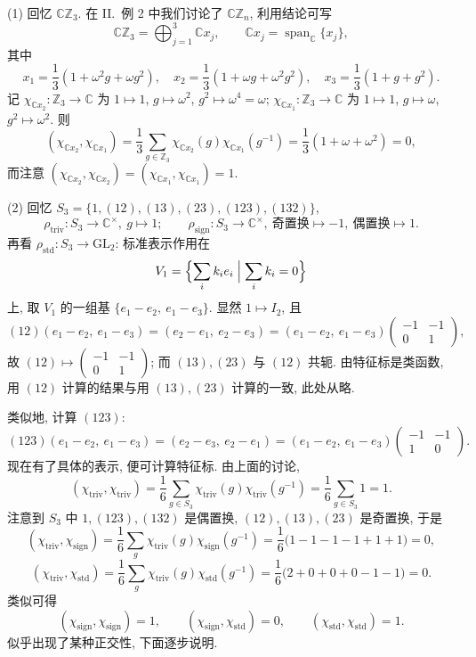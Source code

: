 \begin{example}\label{eg:char-Z3}
\mbox{}\par\vspace{-0.2em}
(1) 回忆 $\mathbb{C}\mathbb{Z}_3$. 在 II.\ 例 2 中我们讨论了 $\mathbb{C}\mathbb{Z}_n$, 利用结论可写
\[
  \mathbb{C}\mathbb{Z}_3=\bigoplus_{j=1}^{3}\mathbb{C}x_j,\qquad
  \mathbb{C}x_j=\operatorname{span}_{\mathbb{C}}\{x_j\},
\]
其中
\[
  x_1=\frac{1}{3}(1+\omega^2g+\omega g^2),\quad
  x_2=\frac{1}{3}(1+\omega g+\omega^2g^2),\quad
  x_3=\frac{1}{3}(1+g+g^2).
\]
记 $\chi_{\mathbb{C}x_2}\colon\mathbb{Z}_3\to\mathbb{C}$ 为
$1\mapsto 1$, $g\mapsto\omega^2$, $g^2\mapsto\omega^4=\omega$;
$\chi_{\mathbb{C}x_1}\colon\mathbb{Z}_3\to\mathbb{C}$ 为
$1\mapsto 1$, $g\mapsto\omega$, $g^2\mapsto\omega^2$. 则
\[
  (\chi_{\mathbb{C}x_2},\chi_{\mathbb{C}x_1})
  =\frac{1}{3}\sum_{g\in\mathbb{Z}_3}\chi_{\mathbb{C}x_2}(g)\chi_{\mathbb{C}x_1}(g^{-1})
  =\frac{1}{3}(1+\omega+\omega^2)=0,
\]
而注意 $(\chi_{\mathbb{C}x_2},\chi_{\mathbb{C}x_2})=(\chi_{\mathbb{C}x_1},\chi_{\mathbb{C}x_1})=1$.

(2) 回忆 $S_3=\{1,(12),(13),(23),(123),(132)\}$,
\[
  \rho_{\mathrm{triv}}\colon S_3\to\mathbb{C}^\times,\ g\mapsto 1;\qquad
  \rho_{\mathrm{sign}}\colon S_3\to\mathbb{C}^\times,\
  \text{奇置换}\mapsto -1,\ \text{偶置换}\mapsto 1 .
\]
再看 $\rho_{\mathrm{std}}\colon S_3\to\mathrm{GL}_2$: 标准表示作用在
\[
  V_1=\Bigl\{\sum_i k_ie_i \Bigm| \sum_i k_i=0\Bigr\}
\]
上, 取 $V_1$ 的一组基 $\{e_1-e_2,\ e_1-e_3\}$. 显然 $1\mapsto I_2$, 且
\[
  (12)(e_1-e_2,\ e_1-e_3)=(e_2-e_1,\ e_2-e_3)
  =(e_1-e_2,\ e_1-e_3)\begin{pmatrix}-1&-1\\ 0&1\end{pmatrix},
\]
故 $(12)\mapsto\begin{pmatrix}-1&-1\\ 0&1\end{pmatrix}$; 而 $(13),(23)$ 与 $(12)$ 共轭.
由特征标是类函数, 用 $(12)$ 计算的结果与用 $(13),(23)$ 计算的一致, 此处从略.
\end{example}

类似地, 计算 $(123)$:
\[
  (123)(e_1-e_2,\ e_1-e_3)=(e_2-e_3,\ e_2-e_1)
  =(e_1-e_2,\ e_1-e_3)\begin{pmatrix}-1&-1\\ 1&0\end{pmatrix}.
\]
现在有了具体的表示, 便可计算特征标. 由上面的讨论,
\[
  (\chi_{\mathrm{triv}},\chi_{\mathrm{triv}})
  =\frac{1}{6}\sum_{g\in S_3}\chi_{\mathrm{triv}}(g)\chi_{\mathrm{triv}}(g^{-1})
  =\frac{1}{6}\sum_{g\in S_3}1=1 .
\]
注意到 $S_3$ 中 $1,(123),(132)$ 是偶置换, $(12),(13),(23)$ 是奇置换, 于是
\[
  (\chi_{\mathrm{triv}},\chi_{\mathrm{sign}})
  =\frac{1}{6}\sum_{g}\chi_{\mathrm{triv}}(g)\chi_{\mathrm{sign}}(g^{-1})
  =\frac{1}{6}\bigl(1-1-1-1+1+1\bigr)=0,
\]
\[
  (\chi_{\mathrm{triv}},\chi_{\mathrm{std}})
  =\frac{1}{6}\sum_{g}\chi_{\mathrm{triv}}(g)\chi_{\mathrm{std}}(g^{-1})
  =\frac{1}{6}\bigl(2+0+0+0-1-1\bigr)=0 .
\]
类似可得
\[
  (\chi_{\mathrm{sign}},\chi_{\mathrm{sign}})=1,\qquad
  (\chi_{\mathrm{sign}},\chi_{\mathrm{std}})=0,\qquad
  (\chi_{\mathrm{std}},\chi_{\mathrm{std}})=1 .
\]
似乎出现了某种正交性, 下面逐步说明.


